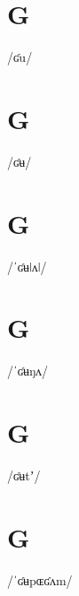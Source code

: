 \documentclass[10pt,a4paper,twoside]{book}
\begin{document}
\section*{G}

\begin{multicols}{3}
 {/ʛu/} {}
\end{multicols}

\section*{G}

\begin{multicols}{3}
 {/ʛʉ/} {}
\end{multicols}

\section*{G}

\begin{multicols}{3}
 {/ˈʛʉǀʌǀ/} {}
\end{multicols}

\section*{G}

\begin{multicols}{3}
 {/ˈʛʉŋʌ/} {}
\end{multicols}

\section*{G}

\begin{multicols}{3}
 {/ʛʉtʼ/} {}
\end{multicols}

\section*{G}

\begin{multicols}{3}
 {/ˈʛʉpɶʛʌm/} {}
\end{multicols}
\end{document}
